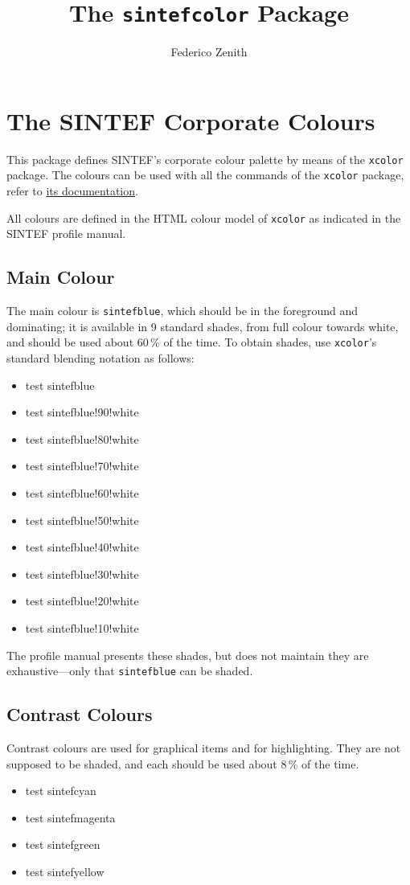 \documentclass{sintefdoc}
\title{The \texttt{sintefcolor} Package}
\author{Federico Zenith}
\newcommand{\testcolor}[1]{\colorbox{#1}{\textcolor{#1}{test}} #1}
\begin{document}
\maketitle

\section*{The SINTEF Corporate Colours}
This package defines SINTEF's corporate colour palette by means of the
\texttt{xcolor} package.
The colours can be used with all the commands of the \texttt{xcolor} package,
refer to \href{http://mirror.ctan.org/macros/latex/contrib/xcolor/xcolor.pdf}
{its documentation}.

All colours are defined in the HTML colour model of \texttt{xcolor} as indicated
in the SINTEF profile manual.

\subsection*{Main Colour}
The main colour is \texttt{sintefblue}, which should be in the foreground and
dominating; it is available in 9 standard shades, from full colour towards white,
and should be used about 60\,\% of the time.
To obtain shades, use \texttt{xcolor}'s standard blending notation as follows:
\begin{itemize}
\item \testcolor{sintefblue}
\item \testcolor{sintefblue!90!white}
\item \testcolor{sintefblue!80!white}
\item \testcolor{sintefblue!70!white}
\item \testcolor{sintefblue!60!white}
\item \testcolor{sintefblue!50!white}
\item \testcolor{sintefblue!40!white}
\item \testcolor{sintefblue!30!white}
\item \testcolor{sintefblue!20!white}
\item \testcolor{sintefblue!10!white}
\end{itemize}
The profile manual presents these shades, but does not maintain they are
exhaustive---only that \texttt{sintefblue} can be shaded.

\subsection*{Contrast Colours}
Contrast colours are used for graphical items and for highlighting. They are not
supposed to be shaded, and each should be used about 8\,\% of the time.
\begin{itemize}
\item \testcolor{sintefcyan}
\item \testcolor{sintefmagenta}
\item \testcolor{sintefgreen}
\item \testcolor{sintefyellow}
\end{itemize}
\end{document}
